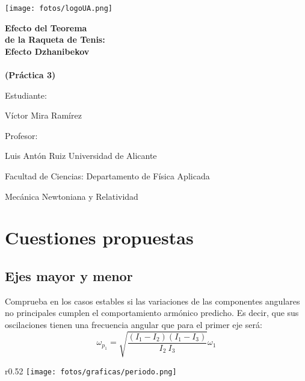 \documentclass[11pt]{article}
\newcommand{\laputa}[1]{\begin{note}{#1}{}\end{note}}
\newcommand{\titulo}{Efecto del Teorema\\ de la Raqueta de Tenis:\\
Efecto Dzhanibekov\\\ \\(Práctica 3)}
\newcommand{\nombreestudiante}{Víctor Mira Ramírez}
\newcommand{\nombredirector}{Luis Antón Ruiz}
\newcommand{\fecha}{\date{Enero 2024}}
\begin{document}
    \begin{titlepage}
    	\centering
    	\texttt{[image: fotos/logoUA.png]}\par
    	\vspace{1cm}
    	{\huge\bfseries \vspace{15mm} \titulo \par}
    	\vfill
    	{\large 
    	\vfill
    	Estudiante:\par\vspace{2mm}
    	\nombreestudiante\par
    	\vfill
    	Profesor:\par\vspace{2mm}
        \nombredirector
        \vfill
        Universidad de Alicante\par
        Facultad de Ciencias: Departamento de Física Aplicada\par
        Mecánica Newtoniana y Relatividad\par
    	\fecha\par}
    \end{titlepage}
    
    \clearpage

    \begin{abstract}\label{sec:abstract}
	\end{abstract}\vspace{0.3cm}  
    
    \tableofcontents
    \clearpage
        
    \section{Cuestiones propuestas}
        \subsection{Ejes mayor y menor}
            \laputa{Comprueba en los casos estables si las variaciones de las componentes angulares no principales cumplen el comportamiento armónico predicho. Es decir, que sus oscilaciones tienen una frecuencia angular que para el primer eje será:
            \[\omega_{p_1}=\sqrt{\dfrac{(I_1-I_2)(I_1-I_3)}{I_2\ I_3}}\omega_1\]}   
                \vspace{0.1cm}
            \begin{wrapfigure}[13]{r}{0.52\textwidth}
                \vspace{-0.5cm}
                \centering
                \texttt{[image: fotos/graficas/periodo.png]}
            \end{wrapfigure}
            
\end{document}
